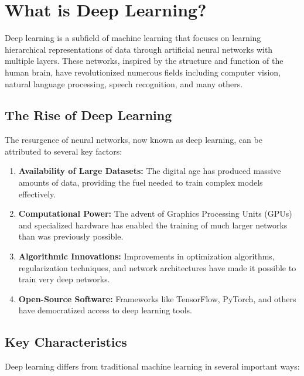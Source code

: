 
\section{What is Deep Learning?}
\label{sec:what-is-dl}

Deep learning is a subfield of machine learning that focuses on learning hierarchical representations of data through artificial neural networks with multiple layers. These networks, inspired by the structure and function of the human brain, have revolutionized numerous fields including computer vision, natural language processing, speech recognition, and many others.

\subsection{The Rise of Deep Learning}

The resurgence of neural networks, now known as deep learning, can be attributed to several key factors:

\begin{enumerate}
    \item \textbf{Availability of Large Datasets:} The digital age has produced massive amounts of data, providing the fuel needed to train complex models effectively.
    
    \item \textbf{Computational Power:} The advent of Graphics Processing Units (GPUs) and specialized hardware has enabled the training of much larger networks than was previously possible.
    
    \item \textbf{Algorithmic Innovations:} Improvements in optimization algorithms, regularization techniques, and network architectures have made it possible to train very deep networks.
    
    \item \textbf{Open-Source Software:} Frameworks like TensorFlow, PyTorch, and others have democratized access to deep learning tools.
\end{enumerate}

\subsection{Key Characteristics}

Deep learning differs from traditional machine learning in several important ways:

